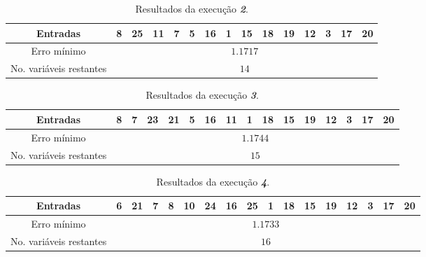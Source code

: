 \begin{enumerate}
\begin{enumerate}
\begin{table}[H]
\begin{tabular}{|c | c | c | c | c | c | c | c | c | c | c | c | c | c | c |
					c|}
					\end{tabular}	    
			    \end{table}    

		\vspace{-12pt}

			\begin{table}[H]
				    \centering
				    \footnotesize
					\caption{\label{tab:backward2_sunspot} Resultados da execução
					\textit{\textbf{2}}.}
				    \vspace{-6pt}
					\begin{tabular}{|c | c | c | c | c | c | c | c | c | c | c | c | c | c | c
					|}
					\hline
					Entradas & 8 & 25 & 11 & 7 & 5 & 16 & 1 & 15 & 18 & 19 & 12 & 3 & 17 & 20  \\
					\hline
					Erro mínimo & \multicolumn{14}{c|}{\(1.1717\)}  \\ \hline
					No. variáveis restantes & \multicolumn{14}{c|}{\(14\)}  \\
					\hline
					
					\end{tabular}	    
			    \end{table}       

		\vspace{-12pt}

			\begin{table}[H]
				    \centering
				    \footnotesize
					\caption{\label{tab:backward3_sunspot} Resultados da execução
					\textit{\textbf{3}}.}
				    \vspace{-6pt}
					\begin{tabular}{|c | c | c | c | c | c | c | c | c | c | c | c | c | c | c |
					c |}
					\hline
					Entradas & 8 & 7 & 23 & 21 & 5 & 16 & 11 & 1 & 18 & 15 & 19 & 12 & 3 & 17 & 20  \\
					\hline
					Erro mínimo & \multicolumn{15}{c|}{\(1.1744\)}  \\ \hline
					No. variáveis restantes & \multicolumn{15}{c|}{\(15\)}  \\
					\hline
					
					\end{tabular}	    
			    \end{table}       
		\vspace{-12pt}

			\begin{table}[H]
				    \centering
				    \footnotesize
					\caption{\label{tab:backward4_sunspot} Resultados da execução
					\textit{\textbf{4}}.}
				    \vspace{-6pt}
					\begin{tabular}{|c | c | c | c | c | c | c | c | c | c  | c | c | c | c | c
					| c | c | }
					\hline
					Entradas & 6 & 21 & 7 & 8 & 10 & 24 & 16 & 25 & 1 & 18 & 15 & 19 & 12 & 3 & 17 & 20  \\
					\hline
					Erro mínimo & \multicolumn{16}{c|}{\(1.1733\)}  \\ \hline
					No. variáveis restantes & \multicolumn{16}{c|}{\(16\)}  \\
					\hline
					

\end{tabular}
\end{table}
\end{enumerate}
\end{enumerate}
